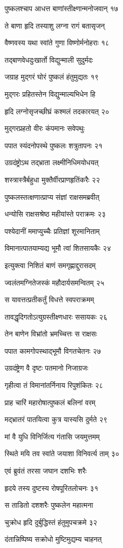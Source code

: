पुष्कलश्चाप आधत्त बाणांस्तीक्ष्णान्मनोजवान् १७

ते बाणा हृदि तस्याशु लग्ना रागं बतासृजन्

वैष्णवस्य यथा स्वांते गुणा विष्णोर्मनोहराः १८

तद्बाणवेधदुःखार्तो विद्युन्माली सुदुर्मदः

जग्राह मुद्गरं घोरं पुष्कलं हंतुमुद्यतः १९

मुद्गरः प्रहितस्तेन विद्युन्माल्यभिधेन हि

हृदि लग्नोसृजच्छीघ्रं कश्मलं तदकारयत् २०

मुद्गरप्रहतो वीरः कंपमानः सवेपथुः

पपात स्यंदनोपस्थे पुष्कलः शत्रुतापनः २१

उग्रदंष्ट्रोऽथ तद्भ्राता लक्ष्मीनिधिमयोधयत्

शस्त्रास्त्रैर्बहुधा मुक्तैर्वीरप्राणहृतिंकरैः २२

पुष्कलस्तत्क्षणात्प्राप्य संज्ञां राक्षसमब्रवीत्

धन्योसि राक्षसश्रेष्ठ महीयांस्ते पराक्रमः २३

पश्येदानीं ममाप्युच्चैः प्रतिज्ञां शूरमानिताम्

विमानात्पातयाम्यद्य भूमौ त्वां शितसायकैः २४

इत्युक्त्वा निशितं बाणं समगृह्णाद्दुरासदम्

ज्वलंतमग्नितेजस्कं महौदार्यसमन्वितम् २५

स यावत्तत्प्रतीकर्तुं विधत्ते स्वपराक्रमम्

तावद्धृदिगतोऽत्युग्रस्तीक्ष्णधारः ससायकः २६

तेन बाणेन विभ्रांतो भ्रमच्चित्तः स राक्षसः

पपात कामगोपस्थाद्भूमौ विगतचेतनः २७

उग्रदंष्ट्रेण वै दृष्टः पतमानो निजाग्रजः

गृहीत्वा तं विमानांतर्निनाय रिपुशंकितः २८

प्राह चारिं महारोषात्पुष्कलं बलिनां वरम्

मद्भ्रातरं पातयित्वा कुत्र यास्यसि दुर्मते २९

मां वै युधि विनिर्जित्य गंतासि जयमुत्तमम्

स्थिते मयि तव स्वांते जयाशा विनिवर्त्य ताम् ३०

एवं ब्रुवंतं तरसा जघान दशभिः शरैः

हृदये तस्य दुष्टस्य रोषपूरितलोचनः ३१

स ताडितो दशशरैः पुष्कलेन महात्मना

चुक्रोध हृदि दुर्बुद्धिस्तं हंतुमुपचक्रमे ३२

दंतान्निष्पिष्य सक्रोधो मुष्टिमुद्यम्य चाहनत्

